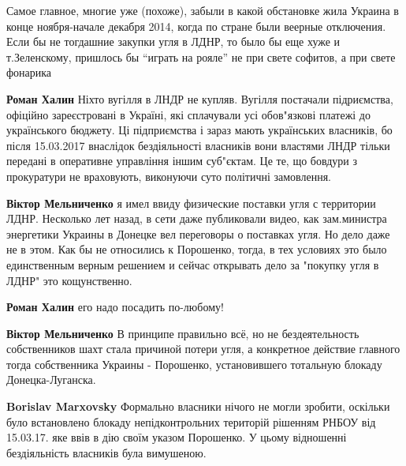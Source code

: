  
 
 
 
 
\zzSecCmt

\begin{itemize} %

Самое главное, многие уже (похоже), забыли в какой обстановке жила Украина в
конце ноября-начале декабря 2014, когда по стране были веерные отключения. Если
бы не тогдашние закупки угля в ЛДНР, то было бы еще хуже и т.Зеленскому,
пришлось бы \enquote{играть на рояле} не при свете софитов, а при свете фонарика

\begin{itemize} %
\textbf{Роман Халин} Ніхто вугілля в ЛНДР не купляв. Вугілля постачали підриємства, офіційно зареєстровані в Україні, які сплачували усі обов"язкові платежі до українського бюджету. Ці підприємства і зараз мають українських власників, бо після 15.03.2017 внаслідок бездіяльності власників вони властями ЛНДР тільки передані в оперативне управління іншим суб"єктам. Це те, що бовдури з прокуратури не враховують, виконуючи суто політичні замовлення.

\textbf{Віктор Мельниченко} я имел ввиду физические поставки угля с территории ЛДНР.
Несколько лет назад, в сети даже публиковали видео, как зам.министра энергетики Украины в Донецке вел переговоры о поставках угля.
Но дело даже не в этом.
Как бы не относились к Порошенко, тогда, в тех условиях это было единственным верным решением и сейчас открывать дело за "покупку угля в ЛДНР" это кощунственно.

\textbf{Роман Халин} его надо посадить по-любому!

\textbf{Віктор Мельниченко} В принципе правильно всё, но не бездеятельность собственников шахт стала причиной потери угля, а конкретное действие главного тогда собственника Украины - Порошенко, установившего тотальную блокаду Донецка-Луганска.

\textbf{Borislav Marxovsky} Формально власники нічого не могли зробити, оскільки було встановлено блокаду непідконтрольних територій рішенням РНБОУ від 15.03.17. яке ввів в дію своїм указом Порошенко. У цьому відношенні бездіяльність власників була вимушеною.
\end{itemize} %


\end{itemize}
